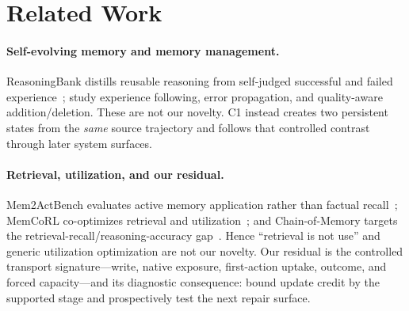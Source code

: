 \section{Related Work}
\paragraph{Self-evolving memory and memory management.} ReasoningBank distills reusable reasoning from self-judged successful and failed experience~\citep{ouyang2026reasoningbank}; \citet{xiong2026memorymanagement} study experience following, error propagation, and quality-aware addition/deletion. These are not our novelty. C1 instead creates two persistent states from the \emph{same} source trajectory and follows that controlled contrast through later system surfaces.

\paragraph{Retrieval, utilization, and our residual.} Mem2ActBench evaluates active memory application rather than factual recall~\citep{shen2026mem2actbench}; MemCoRL co-optimizes retrieval and utilization~\citep{liu2026memcorl}; and Chain-of-Memory targets the retrieval-recall/reasoning-accuracy gap~\citep{xu2026chainofmemory}. Hence ``retrieval is not use'' and generic utilization optimization are not our novelty. Our residual is the controlled transport signature---write, native exposure, first-action uptake, outcome, and forced capacity---and its diagnostic consequence: bound update credit by the supported stage and prospectively test the next repair surface.
